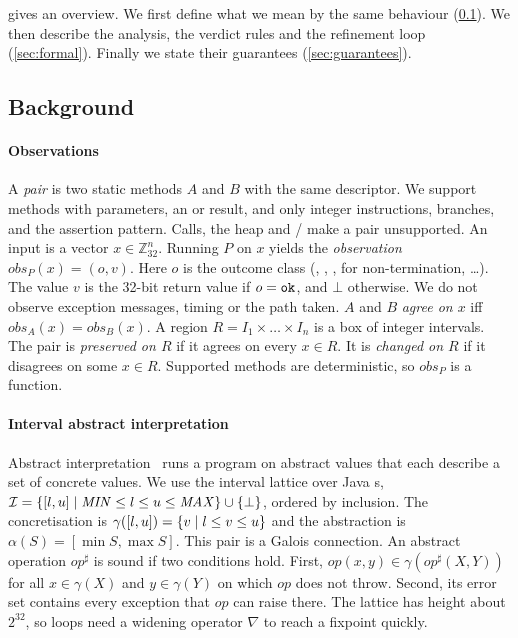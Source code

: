  gives an overview. We first define what we mean by the same behaviour
(\cref{sec:background}). We then describe the analysis, the verdict rules and the refinement
loop (\cref{sec:formal}). Finally we state their guarantees (\cref{sec:guarantees}).

\subsection{Background}
\label{sec:background}

\paragraph{Observations}
A \emph{pair} is two static methods $A$ and $B$ with the same descriptor. We support methods
with  parameters, an  or  result, and only integer
instructions, branches,  and the assertion pattern. Calls, the heap and
/ make a pair unsupported. An input is a vector
$x \in \mathbb{Z}_{32}^n$. Running $P$ on $x$ yields the \emph{observation}
$\mathit{obs}_P(x) = (o, v)$. Here $o$ is the outcome class (\ok{}, ,
\dbz{}, \code{*} for non-termination, \ldots). The value $v$ is the 32-bit return value if
$o = \texttt{ok}{}$, and $\bot$ otherwise. We do not observe exception messages, timing or the path
taken. $A$ and $B$ \emph{agree on $x$} iff $\mathit{obs}_A(x) = \mathit{obs}_B(x)$. A
region $R = I_1 \times \dots \times I_n$ is a box of integer intervals. The pair is
\emph{preserved on $R$} if it agrees on every $x \in R$. It is \emph{changed on $R$} if it
disagrees on some $x \in R$. Supported methods are deterministic, so $\mathit{obs}_P$ is a
function.

\paragraph{Interval abstract interpretation}
Abstract interpretation~\citep{cousot1977abstract} runs a program on abstract values that
each describe a set of concrete values. We use the interval lattice over Java s,
$\mathcal{I} = \left\{[l,u] \mid \mathit{MIN} \le l \le u \le \mathit{MAX}\right\} \cup \left\{\bot\right\}$,
ordered by inclusion. The concretisation is $\gamma([l,u]) = \left\{v \mid l \le v \le u\right\}$ and
the abstraction is $\alpha(S) = [\min S, \max S]$. This pair is a Galois connection. An
abstract operation $\mathit{op}^\sharp$ is sound if two conditions hold. First,
$\mathit{op}(x,y) \in \gamma(\mathit{op}^\sharp(X,Y))$ for all $x \in \gamma(X)$ and
$y \in \gamma(Y)$ on which $\mathit{op}$ does not throw. Second, its error set contains every
exception that $\mathit{op}$ can raise there. The lattice has height about $2^{32}$, so loops
need a widening operator $\nabla$ to reach a fixpoint quickly.

